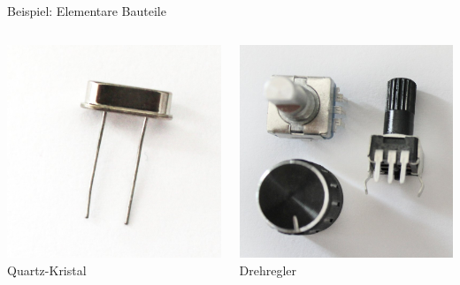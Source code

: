 {\begin{frame}{Beispiel: Elementare Bauteile}
    \begin{columns}
        \includegraphics[width=.8\textwidth]{2-hardwaredesign/img/komponenten_elementar_quartz} \\
        Quartz-Kristal

        \includegraphics[width=.8\textwidth]{2-hardwaredesign/img/komponenten_elementar_drehregler} \\
        Drehregler


\end{columns}
\end{frame}}
